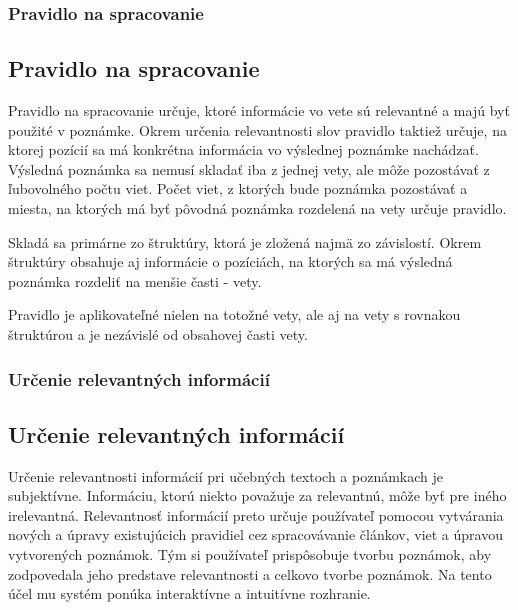 %
%
{
	\subsubsection{Pravidlo na spracovanie}
}
{
	\subsection{Pravidlo na spracovanie}
}
\label{subsubsection:rule_for_processing}
Pravidlo na spracovanie určuje, ktoré informácie vo vete sú relevantné a majú byť použité v poznámke. Okrem určenia relevantnosti slov pravidlo taktiež určuje, na ktorej pozícií sa má konkrétna informácia vo výslednej poznámke nachádzať. Výsledná poznámka sa nemusí skladať iba z jednej vety, ale môže pozostávať z ľubovolného počtu viet. Počet viet, z ktorých bude poznámka pozostávať a miesta, na ktorých má byť pôvodná poznámka rozdelená na vety určuje pravidlo.

Skladá sa primárne zo štruktúry, ktorá je zložená najmä zo závislostí. Okrem štruktúry obsahuje aj informácie o pozíciách, na ktorých sa má výsledná poznámka rozdeliť na menšie časti - vety.

Pravidlo je aplikovateľné nielen na totožné vety, ale aj na vety s rovnakou štruktúrou a je nezávislé od obsahovej časti vety.

%
%
{
	\subsubsection{Určenie relevantných informácií}
}
{
	\subsection{Určenie relevantných informácií}
}
\label{subsubsection:determination_of_relevant_information}
Určenie relevantnosti informácií pri učebných textoch a poznámkach je subjektívne. Informáciu, ktorú niekto považuje za relevantnú, môže byť pre iného irelevantná. Relevantnosť informácií preto určuje používateľ pomocou vytvárania nových a úpravy existujúcich pravidiel cez spracovávanie článkov, viet a úpravou vytvorených poznámok. Tým si používateľ prispôsobuje tvorbu poznámok, aby zodpovedala jeho predstave relevantnosti a celkovo tvorbe poznámok. Na tento účel mu systém ponúka interaktívne a intuitívne rozhranie.

